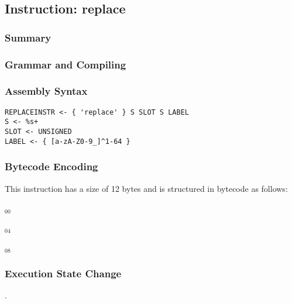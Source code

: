 \subsection{Instruction: replace}

\subsubsection{Summary}


\subsubsection{Grammar and Compiling}


\subsubsection{Assembly Syntax}

\begin{myquote}
\begin{verbatim}
REPLACEINSTR <- { 'replace' } S SLOT S LABEL
S <- %s+
SLOT <- UNSIGNED
LABEL <- { [a-zA-Z0-9_]^1-64 }
\end{verbatim}
\end{myquote}

\subsubsection{Bytecode Encoding}

This instruction has a size of 12 bytes and is structured in bytecode as follows:

$_{00}$\ 



$_{04}$\ 



$_{08}$\ 
\fbox{%
  \parbox{20pt}{%
00
  }%
}


\subsubsection{Execution State Change}

.


